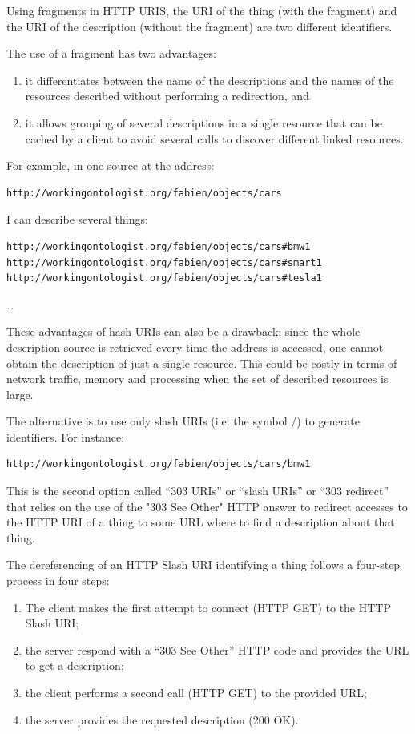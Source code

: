 Using fragments in HTTP URIS, the URI of the thing (with the fragment)
and the URI of the description (without the fragment) are two different
identifiers.

The use of a fragment has two advantages:

\begin{enumerate}
\def\labelenumi{\arabic{enumi}.}
\item
  it differentiates between the name of the descriptions and the
  names of the resources described without performing a redirection, and
\item
  it allows grouping of several descriptions in a single resource that can be
  cached by a client to avoid several calls to discover different linked resources.
\end{enumerate}

For example, in one source at the address:

\begin{lstlisting}
http://workingontologist.org/fabien/objects/cars
\end{lstlisting}


I can describe several things:


\begin{lstlisting}
http://workingontologist.org/fabien/objects/cars#bmw1
http://workingontologist.org/fabien/objects/cars#smart1
http://workingontologist.org/fabien/objects/cars#tesla1
\end{lstlisting}
\ldots{} 

These advantages of hash URIs can also be a drawback; since the whole
description source is retrieved every time the address is accessed, one
cannot obtain the description of just a  single resource.  This could 
be costly in terms of network traffic, memory and processing
when the set of described resources is large.

The alternative is to use only slash URIs (i.e. the symbol /) 
to generate identifiers. For instance:

\begin{lstlisting}
http://workingontologist.org/fabien/objects/cars/bmw1
\end{lstlisting}


This is the second option called ``303 URIs'' or ``slash URIs'' or ``303
redirect'' that relies on the use of the "303 See Other" HTTP answer to
redirect accesses to the HTTP URI of a thing to some URL where to find a
description about that thing.

The dereferencing of an HTTP Slash URI identifying a thing follows  a four-step 
process in four steps: 
\begin{enumerate}
    \item The client makes the first
attempt to connect (HTTP GET) to the HTTP Slash URI; 
    \item the server
respond with a ``303 See Other'' HTTP code and provides the URL to get a
description;
    \item the client performs a second call (HTTP GET) to the
provided URL;
    \item the server provides the requested description (200
OK).
\end{enumerate}

